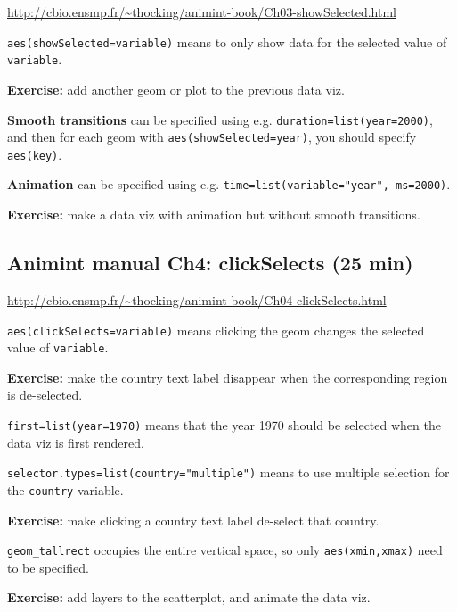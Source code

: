 \documentclass{article}
\begin{document}
\url{http://cbio.ensmp.fr/~thocking/animint-book/Ch03-showSelected.html}

\hrulefill

\texttt{aes(showSelected=variable)} means to only show data for the
selected value of \texttt{variable}.

\textbf{Exercise:} add another geom or plot to the previous data viz.

\hrulefill

\textbf{Smooth transitions} can be specified using
e.g. \texttt{duration=list(year=2000)},\\and then for each geom with
\texttt{aes(showSelected=year)}, you should specify \texttt{aes(key)}.

\textbf{Animation} can be specified using
e.g. \texttt{time=list(variable="year", ms=2000)}.

\textbf{Exercise:} make a data viz with animation but without smooth
transitions.

\subsection*{Animint manual Ch4: clickSelects (25 min)}
\url{http://cbio.ensmp.fr/~thocking/animint-book/Ch04-clickSelects.html}

\hrulefill

\texttt{aes(clickSelects=variable)} means clicking the geom changes
the selected value of \texttt{variable}.

\textbf{Exercise:} make the country text label disappear when the
corresponding region is de-selected.

\hrulefill

\texttt{first=list(year=1970)} means that the year 1970 should be
selected when the data viz is first rendered.

\texttt{selector.types=list(country="multiple")} means to use multiple
selection for the \texttt{country} variable.

\textbf{Exercise:} make clicking a country text label de-select that
country.

\hrulefill

\verb|geom_tallrect| occupies the entire vertical space, so only
\texttt{aes(xmin,xmax)} need to be specified.

\textbf{Exercise:} add layers to the scatterplot, and animate the data viz.
\end{document}
